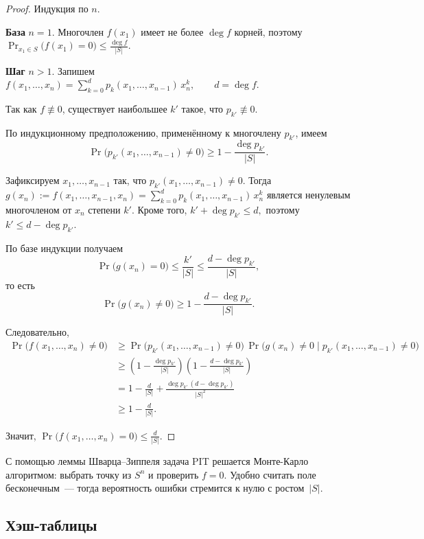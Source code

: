 \begin{proof}
	Индукция по $n$.
	
	\textbf{База} $n = 1$. Многочлен $f(x_1)$ имеет не более $\deg f$ корней, поэтому $\Pr_{x_1 \in S}\bigl(f(x_1) = 0\bigr) \le \frac{\deg f}{|S|}.$
	
	\textbf{Шаг} $n > 1$. Запишем  $f(x_1,\ldots,x_n) = \sum_{k=0}^{d} p_k(x_1,\ldots,x_{n-1})\,x_n^k,
	\qquad d = \deg f.$
	
	Так как $f \not\equiv 0$, существует наибольшее $k'$ такое, что
	$p_{k'} \not\equiv 0$.
	
	По индукционному предположению, применённому к многочлену $p_{k'}$, имеем
	\[
	\Pr\bigl(p_{k'}(x_1,\ldots,x_{n-1}) \neq 0\bigr)
	\ge
	1 - \frac{\deg p_{k'}}{|S|}.
	\]
	
	Зафиксируем $x_1,\ldots,x_{n-1}$ так, что
	$p_{k'}(x_1,\ldots,x_{n-1}) \neq 0$.
	Тогда $g(x_n) := f(x_1,\ldots,x_{n-1},x_n)
	= \sum_{k=0}^{d} p_k(x_1,\ldots,x_{n-1})\,x_n^k$ является ненулевым многочленом от $x_n$ степени $k'$. Кроме того, $k' + \deg p_{k'} \le d,$ поэтому $k' \le d - \deg p_{k'}.$
	
	По базе индукции получаем
	\[
	\Pr\bigl(g(x_n) = 0\bigr) \le \frac{k'}{|S|}
	\le \frac{d - \deg p_{k'}}{|S|},
	\]
	то есть
	\[
	\Pr\bigl(g(x_n) \neq 0\bigr)
	\ge
	1 - \frac{d - \deg p_{k'}}{|S|}.
	\]
	
	Следовательно,
	\begin{align*}
		\Pr\bigl(f(x_1,\ldots,x_n) \neq 0\bigr)
		&\ge
		\Pr\bigl(p_{k'}(x_1,\ldots,x_{n-1}) \neq 0\bigr)\,
		\Pr\bigl(g(x_n) \neq 0 \mid p_{k'}(x_1,\ldots,x_{n-1}) \neq 0\bigr) \\
		&\ge
		\left(1 - \frac{\deg p_{k'}}{|S|}\right)
		\left(1 - \frac{d - \deg p_{k'}}{|S|}\right) \\
		&=
		1 - \frac{d}{|S|}
		+ \frac{\deg p_{k'}\,(d - \deg p_{k'})}{|S|^2} \\
		&\ge
		1 - \frac{d}{|S|}.
	\end{align*}
	
	Значит, $\Pr\bigl(f(x_1,\ldots,x_n) = 0\bigr) \le \frac{d}{|S|}.$
\end{proof}

\begin{Remark}{}{}
	С помощью леммы Шварца--Зиппеля задача PIT решается Монте-Карло алгоритмом:
	выбрать точку из $S^n$ и проверить $f = 0$.
	Удобно считать поле бесконечным~--- тогда вероятность ошибки стремится к нулю
	с ростом~$|S|$.
\end{Remark}

\subsection{Хэш-таблицы}

